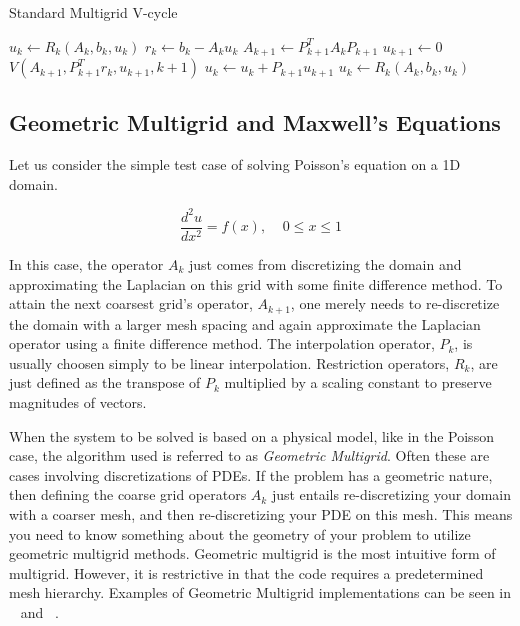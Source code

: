 \documentclass{article}
\begin{document}
\begin{algorithm}
\caption{Standard Multigrid V-cycle}\label{euclid}
\begin{algorithmic}[1]
\State $u_k \gets R_k(A_k,b_k,u_k)$
\State $r_k \gets b_k - A_k u_k$
\State $A_{k+1} \gets  P_{k+1}^T A_k P_{k+1}$
\State $u_{k+1} \gets 0$
\State $V(A_{k+1},P_{k+1}^T r_k,u_{k+1},k+1)$
\State $u_k \gets u_k + P_{k+1} u_{k+1}$
\State $u_k \gets R_k(A_k,b_k,u_k)$
\EndIf
\EndProcedure
\end{algorithmic}
\end{algorithm}

\newpage

\subsection{Geometric Multigrid and Maxwell's Equations}

Let us consider the simple test case of solving Poisson's equation on a 1D domain.

\begin{equation}
\label{eq:7}
 \frac{d^2u}{dx^2} = f(x), \;\;\;\;  0 \leq x \leq 1 
\end{equation}

In this case, the operator $A_k$ just comes from discretizing the domain and approximating the Laplacian on this grid with some finite difference method. To attain the next coarsest grid's operator, $A_{k+1}$, one merely needs to re-discretize the domain with a larger mesh spacing and again approximate the Laplacian operator using a finite difference method. The interpolation operator, $P_k$, is usually choosen simply to be linear interpolation.  Restriction operators, $R_k$, are just defined as the transpose of $P_k$ multiplied by a scaling constant to preserve magnitudes of vectors.

When the system to be solved is based on a physical model, like in the Poisson case, the algorithm used is referred to as \textit{Geometric Multigrid}.  Often these are cases involving discretizations of PDEs.  If the problem has a geometric nature, then defining the coarse grid operators $A_k$ just entails re-discretizing your domain with a coarser mesh, and then re-discretizing your PDE on this mesh.  This means you need to know something about the geometry of your problem to utilize geometric multigrid methods.  Geometric multigrid is the most intuitive form of multigrid. However, it is restrictive in that the code requires a predetermined mesh hierarchy.  Examples of Geometric Multigrid implementations can be seen in ~\cite{briggs2000multigrid} and ~\cite{hackbusch1985multi}.
\end{document}
